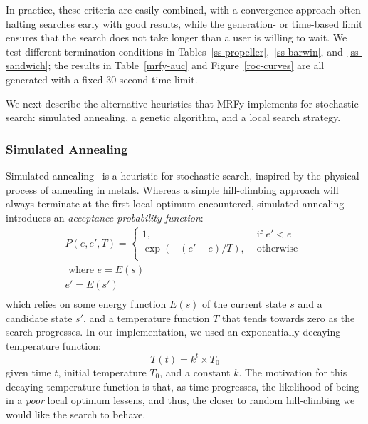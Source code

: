 \documentclass[blockstyle,times,preprint]{sigplanconf}
\begin{document}
In practice, these criteria are easily combined, with a convergence approach
often halting searches early with good results, while the generation- or 
time-based limit ensures that the search does not take longer than a user is
willing to wait.
We test different termination conditions in 
Tables~\ref{ss-propeller},~\ref{ss-barwin}, and~\ref{ss-sandwich};
the results in Table~\ref{mrfy-auc} and Figure~\ref{roc-curves} are all 
generated with a fixed 30 second time limit.

We next describe the alternative heuristics that MRFy implements for stochastic
search: simulated annealing, a genetic algorithm, and a local search strategy.


\subsubsection{Simulated Annealing}

Simulated annealing~\cite{Kirkpatrick:1983wa} is a heuristic for stochastic search,
inspired by the physical process of annealing in metals.
Whereas a simple hill-climbing approach will always terminate at the first 
local optimum encountered,
simulated annealing introduces an \emph{acceptance probability function}:
\begin{equation*}
  \begin{split}
  P(e,e',T) = \begin{cases}
    1, & \text{ if } e' < e\\
    \exp(-(e'-e)/T),& \text{ otherwise }\\
\end{cases}\\
  \text{ where }
     e = E(s) \\
     e' = E(s')\\
  \end{split}
\end{equation*}
which relies on some energy function $E(s)$ of the current state $s$ and
a candidate state $s'$, and a temperature function $T$ that tends towards zero
as the search progresses.
In our implementation, we used an exponentially-decaying temperature function:
\begin{equation*}
  T(t) = k^{t}\times T_{0}
\end{equation*}
given time $t$, initial temperature $T_{0}$, and a constant $k$.
The motivation for this decaying temperature function is that, as time 
progresses, the likelihood of being in a \emph{poor} local optimum lessens, and
thus, the closer to random hill-climbing we would like the search to behave.
\end{document}
